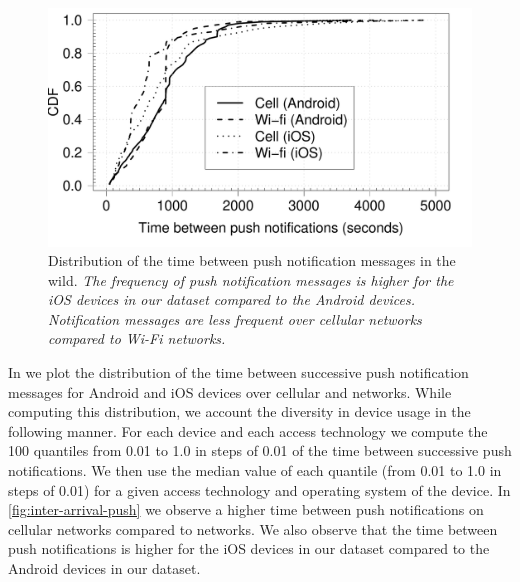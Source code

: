 \begin{figure}
\includegraphics[width=\columnwidth]{plots/cdf_push_comparison_device_wild.pdf}
\caption{Distribution of the time between push notification messages in the wild. \emph{The frequency of push notification messages is higher for the iOS devices in our dataset compared to the Android devices. Notification messages are less frequent over cellular networks compared to Wi-Fi networks.}}
\label{fig:wild-cdf-push}
\end{figure}

In  we plot the distribution of the time between successive push notification messages for Android and iOS devices over cellular and \wifi networks. 
While computing this distribution, we account the diversity in device usage in the following manner.
For each device and each access technology we compute the 100 quantiles from 0.01 to 1.0 in steps of 0.01 of the time between successive push notifications. 
We then use the median value of each quantile (from 0.01 to 1.0 in steps of 0.01) for a given access technology and operating system of the device.
In \ref{fig:inter-arrival-push} we observe a higher time between push notifications on cellular networks compared to \wifi networks. 
We also observe that the time between push notifications is higher for the iOS devices in our dataset compared to the Android devices in our dataset. 

